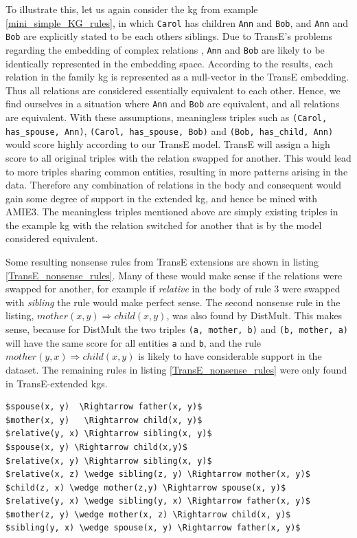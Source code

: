 To illustrate this, let us again consider the \gls{kg} from example \ref{mini_simple_KG_rules}, in which \texttt{Carol} has children \texttt{Ann} and \texttt{Bob}, and \texttt{Ann} and \texttt{Bob} are explicitly stated to be each others siblings. Due to TransE's problems regarding the embedding of complex relations \cite{transH, transR}, \texttt{Ann} and \texttt{Bob} are likely to be identically represented in the embedding space. According to the results, each relation in the family \gls{kg} is represented as a null-vector in the TransE embedding. Thus all relations are considered essentially equivalent to each other. Hence, we find ourselves in a situation where \texttt{Ann} and \texttt{Bob} are equivalent, and all relations are equivalent. With these assumptions, meaningless triples such as
\texttt{(Carol, has\_spouse, Ann)}, \texttt{(Carol, has\_spouse, Bob)} and \texttt{(Bob, has\_child, Ann)} would score highly according to our TransE model. TransE will assign a high score to all original triples with the relation swapped for another. This would lead to more triples sharing common entities, resulting in more patterns arising in the data. Therefore any combination of relations in the body and consequent would gain some degree of support in the extended \gls{kg}, and hence be mined with AMIE3. The meaningless triples mentioned above are simply existing triples in the example \gls{kg} with the relation switched for another that is by the model considered equivalent. 

Some resulting nonsense rules from TransE extensions are shown in listing \ref{TransE_nonsense_rules}. Many of these would make sense if the relations were swapped for another, for example if \textit{relative} in the body of rule 3 were swapped with \textit{sibling} the rule would make perfect sense. The second nonsense rule in the listing, $mother(x, y) \Rightarrow child(x, y)$, was also found by DistMult. This makes sense, because for DistMult the two triples \texttt{(a, mother, b)} and \texttt{(b, mother, a)} will have the same score for all entities \texttt{a} and \texttt{b}, and the rule $mother(y, x) \Rightarrow child(x, y)$ is likely to have considerable support in the dataset. The remaining rules in listing \ref{TransE_nonsense_rules} were only found in TransE-extended \glspl{kg}.

\begin{lstlisting}[mathescape=true, float, caption={Selection of nonsense rules mined from KGs extended with TransE.},captionpos=b, label={TransE_nonsense_rules}]
$spouse(x, y)  \Rightarrow father(x, y)$
$mother(x, y)   \Rightarrow child(x, y)$
$relative(y, x) \Rightarrow sibling(x, y)$
$spouse(x, y) \Rightarrow child(x,y)$
$relative(x, y) \Rightarrow sibling(x, y)$
$relative(x, z) \wedge sibling(z, y) \Rightarrow mother(x, y)$
$child(z, x) \wedge mother(z,y) \Rightarrow spouse(x, y)$
$relative(y, x) \wedge sibling(y, x) \Rightarrow father(x, y)$
$mother(z, y) \wedge mother(x, z) \Rightarrow child(x, y)$
$sibling(y, x) \wedge spouse(x, y) \Rightarrow father(x, y)$
\end{lstlisting}

